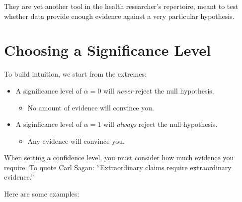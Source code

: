 \documentclass[
  letterpaper,
  DIV=11,
  numbers=noendperiod,
  oneside]{scrreprt}
\providecommand{\tightlist}{%
  \setlength{\itemsep}{0pt}\setlength{\parskip}{0pt}}\usepackage{longtable,booktabs,array}
\begin{document}
\begin{tcolorbox}[enhanced jigsaw, toprule=.15mm, colbacktitle=quarto-callout-important-color!10!white, title=\textcolor{quarto-callout-important-color}{\faExclamation}\hspace{0.5em}{p-values were never meant to be the goal of a study.}, arc=.35mm, colframe=quarto-callout-important-color-frame, colback=white, titlerule=0mm, left=2mm, bottomtitle=1mm, bottomrule=.15mm, breakable, opacitybacktitle=0.6, leftrule=.75mm, toptitle=1mm, coltitle=black, rightrule=.15mm, opacityback=0]

They are yet another tool in the health researcher's repertoire, meant
to test whether data provide enough evidence against a very particular
hypothesis.

\end{tcolorbox}

\hypertarget{choosing-a-significance-level}{%
\section{Choosing a Significance
Level}\label{choosing-a-significance-level}}

To build intuition, we start from the extremes:

\begin{itemize}
\tightlist
\item
  A significance level of \(\alpha = 0\) will \emph{never} reject the
  null hypothesis.

  \begin{itemize}
  \tightlist
  \item
    No amount of evidence will convince you.
  \end{itemize}
\item
  A siginficance level of \(\alpha = 1\) will \emph{always} reject the
  null hypothesis.

  \begin{itemize}
  \tightlist
  \item
    Any evidence will convince you.
  \end{itemize}
\end{itemize}

When setting a confidence level, you must consider how much evidence you
require. To quote Carl Sagan: ``Extraordinary claims require
extraordinary evidence.''

Here are some examples:
\end{document}
